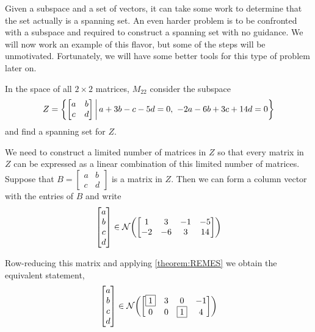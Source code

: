 \documentclass{ximera}
\begin{document}
Given a subspace and a set of vectors, it can take some work to
determine that the set actually is a spanning set.  An even harder
problem is to be confronted with a subspace and required to construct
a spanning set with no guidance.  We will now work an example of this
flavor, but some of the steps will be unmotivated.  Fortunately, we
will have some better tools for this type of problem later on.

\begin{example}
  In the space of all $2\times 2$ matrices, $M_{22}$ consider the subspace
  \[
    Z=\setparts{\begin{bmatrix}a&b\\c&d\end{bmatrix}}{a+3b-c-5d=0,\ -2a-6b+3c+14d=0}
  \]
  and find a spanning set for $Z$.

  We need to construct a limited number of matrices in $Z$ so that
  every matrix in $Z$ can be expressed as a linear combination of this
  limited number of matrices.  Suppose that
  $B=\begin{bmatrix}a&b\\c&d\end{bmatrix}$ is a matrix in $Z$.  Then
  we can form a column vector with the entries of $B$ and write
  \[
    \begin{bmatrix}a\\b\\c\\d\end{bmatrix}\in
    \mathcal{N}\!\left(\begin{bmatrix}1 & 3 & -1 & -5\\-2 & -6 & 3 & 14\end{bmatrix}\right)
  \]

  Row-reducing this matrix and applying \ref{theorem:REMES} we obtain
  the equivalent statement,
  \[
    \begin{bmatrix}a\\b\\c\\d\end{bmatrix}\in
    \mathcal{N}\!\left(\begin{bmatrix}\fbox{1} & 3 & 0 & -1\\0 & 0 & \fbox{1} & 4\end{bmatrix}\right)
  \]


\end{example}
\end{document}
